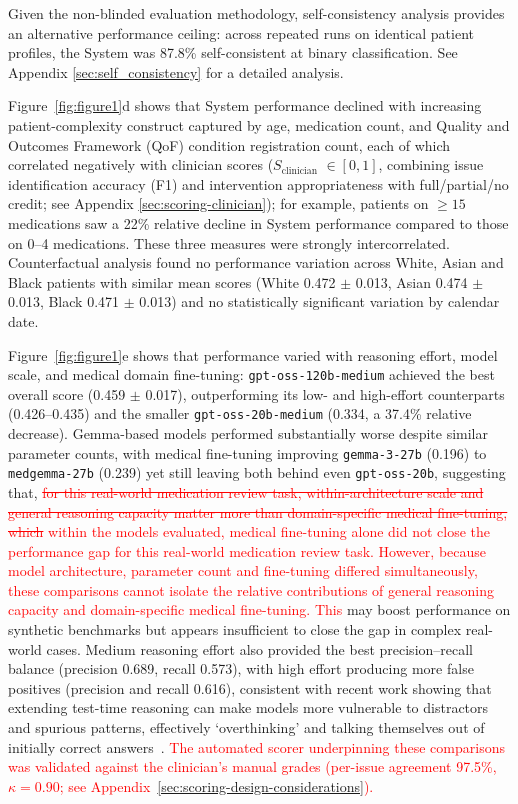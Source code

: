 \documentclass[12pt]{article}
\newcommand{\added}[1]{\textcolor{red}{#1}}
\newcommand{\removed}[1]{\textcolor{red}{\sout{#1}}}
\begin{document}
Given the non-blinded evaluation methodology, self-consistency analysis provides an alternative performance ceiling: across repeated runs on identical patient profiles, the System was 87.8\% self-consistent at binary classification. See Appendix \ref{sec:self_consistency} for a detailed analysis.

Figure~\ref{fig:figure1}d shows that System performance declined with increasing patient-complexity construct captured by age, medication count, and Quality and Outcomes Framework (QoF) condition registration count, each of which correlated negatively with clinician scores ($S_{\text{clinician}}$ $\in [0,1]$, combining issue identification accuracy (F1) and intervention appropriateness with full/partial/no credit; see Appendix \ref{sec:scoring-clinician}); for example, patients on $\geq 15$ medications saw a 22\% relative decline in System performance compared to those on 0--4 medications. These three measures were strongly intercorrelated. Counterfactual analysis found no performance variation across White, Asian and Black patients with similar mean scores (White 0.472 $\pm$ 0.013, Asian 0.474 $\pm$ 0.013, Black 0.471 $\pm$ 0.013) and no statistically significant variation by calendar date.

Figure~\ref{fig:figure1}e shows that performance varied with reasoning effort, model scale, and medical domain fine-tuning: \texttt{gpt-oss-120b-medium} achieved the best overall score (0.459 $\pm$ 0.017), outperforming its low- and high-effort counterparts (0.426--0.435) and the smaller \texttt{gpt-oss-20b-medium} (0.334, a 37.4\% relative decrease). Gemma-based models performed substantially worse despite similar parameter counts, with medical fine-tuning improving \texttt{gemma-3-27b} (0.196) to \texttt{medgemma-27b} (0.239) yet still leaving both behind even \texttt{gpt-oss-20b}, suggesting that, \removed{for this real-world medication review task, within-architecture scale and general reasoning capacity matter more than domain-specific medical fine-tuning, which} \added{within the models evaluated, medical fine-tuning alone did not close the performance gap for this real-world medication review task. However, because model architecture, parameter count and fine-tuning differed simultaneously, these comparisons cannot isolate the relative contributions of general reasoning capacity and domain-specific medical fine-tuning. This} may boost performance on synthetic benchmarks but appears insufficient to close the gap in complex real-world cases. Medium reasoning effort also provided the best precision--recall balance (precision 0.689, recall 0.573), with high effort producing more false positives (precision and recall 0.616), consistent with recent work showing that extending test-time reasoning can make models more vulnerable to distractors and spurious patterns, effectively `overthinking' and talking themselves out of initially correct answers~\cite{gema2025inversescalingtesttimecompute}. \added{The automated scorer underpinning these comparisons was validated against the clinician's manual grades (per-issue agreement 97.5\%, $\kappa = 0.90$; see Appendix~\ref{sec:scoring-design-considerations}).}
\end{document}
